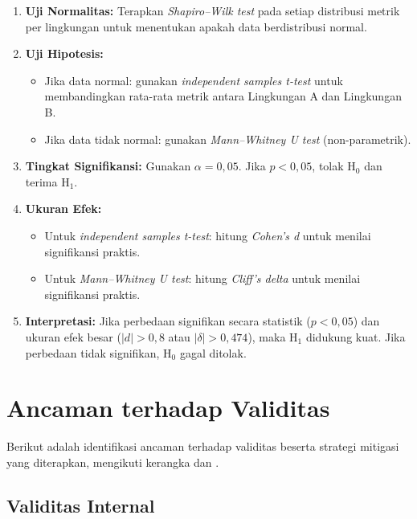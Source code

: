 \begin{enumerate}
    \item \textbf{Uji Normalitas:} Terapkan \textit{Shapiro--Wilk test} pada setiap distribusi metrik per lingkungan untuk menentukan apakah data berdistribusi normal.
    
    \item \textbf{Uji Hipotesis:}
    \begin{itemize}
        \item Jika data normal: gunakan \textit{independent samples t-test} untuk membandingkan rata-rata metrik antara Lingkungan A dan Lingkungan B.
        \item Jika data tidak normal: gunakan \textit{Mann--Whitney U test} (non-parametrik).
    \end{itemize}
    
    \item \textbf{Tingkat Signifikansi:} Gunakan $\alpha = 0,05$. Jika $p < 0,05$, tolak H$_0$ dan terima H$_1$.
    
    \item \textbf{Ukuran Efek:}
    \begin{itemize}
        \item Untuk \textit{independent samples t-test}: hitung \textit{Cohen's d} untuk menilai signifikansi praktis.
        \item Untuk \textit{Mann--Whitney U test}: hitung \textit{Cliff's delta} untuk menilai signifikansi praktis.
    \end{itemize}
    
    \item \textbf{Interpretasi:} Jika perbedaan signifikan secara statistik ($p < 0,05$) dan ukuran efek besar ($|d| > 0{,}8$ atau $|\delta| > 0{,}474$), maka H$_1$ didukung kuat. Jika perbedaan tidak signifikan, H$_0$ gagal ditolak.
\end{enumerate}

\section{Ancaman terhadap Validitas}

Berikut adalah identifikasi ancaman terhadap validitas beserta strategi mitigasi yang diterapkan, mengikuti kerangka \citet{wohlin2012experimentation} dan \citet{cook1979quasi}.

\subsection{Validitas Internal}

